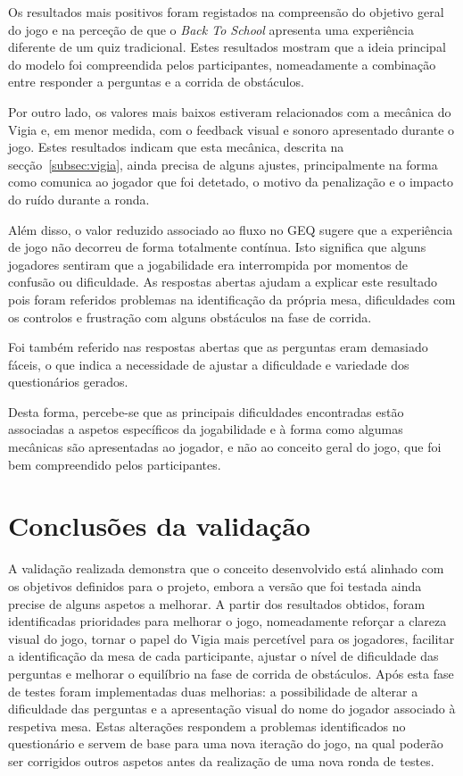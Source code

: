 Os resultados mais positivos foram registados na compreensão do objetivo geral do jogo e na perceção de que o \textit{Back To School} apresenta uma experiência diferente de um quiz tradicional. Estes resultados mostram que a ideia principal do modelo foi compreendida pelos participantes, nomeadamente a combinação entre responder a perguntas e a corrida de obstáculos.

Por outro lado, os valores mais baixos estiveram relacionados com a mecânica do Vigia e, em menor medida, com o feedback visual e sonoro apresentado durante o jogo. Estes resultados indicam que esta mecânica, descrita na secção~\ref{subsec:vigia}, ainda precisa de alguns ajustes, principalmente na forma como comunica ao jogador que foi detetado, o motivo da penalização e o impacto do ruído durante a ronda.

Além disso, o valor reduzido associado ao fluxo no GEQ sugere que a experiência de jogo não decorreu de forma totalmente contínua. Isto significa que alguns jogadores sentiram que a jogabilidade era interrompida por momentos de confusão ou dificuldade. As respostas abertas ajudam a explicar este resultado pois foram referidos problemas na identificação da própria mesa, dificuldades com os controlos e frustração com alguns obstáculos na fase de corrida.

Foi também referido nas respostas abertas que as perguntas eram demasiado fáceis, o que indica a necessidade de ajustar a dificuldade e variedade dos questionários gerados.

Desta forma, percebe-se que as principais dificuldades encontradas estão associadas a aspetos específicos da jogabilidade e à forma como algumas mecânicas são apresentadas ao jogador, e não ao conceito geral do jogo, que foi bem compreendido pelos participantes.


\section{Conclusões da validação}
\label{sec:conclusoesValidacao}

A validação realizada demonstra que o conceito desenvolvido está alinhado com os objetivos definidos para o projeto, embora a versão que foi testada ainda precise de alguns aspetos a melhorar. A partir dos resultados obtidos, foram identificadas prioridades para melhorar o jogo, nomeadamente reforçar a clareza visual do jogo, tornar o papel do Vigia mais percetível para os jogadores, facilitar a identificação da mesa de cada participante, ajustar o nível de dificuldade das perguntas e melhorar o equilíbrio na fase de corrida de obstáculos. Após esta fase de testes foram implementadas duas melhorias: a possibilidade de alterar a dificuldade das perguntas e a apresentação visual do nome do jogador associado à respetiva mesa. Estas alterações respondem a problemas identificados no questionário e servem de base para uma nova iteração do jogo, na qual poderão ser corrigidos outros aspetos antes da realização de uma nova ronda de testes.




